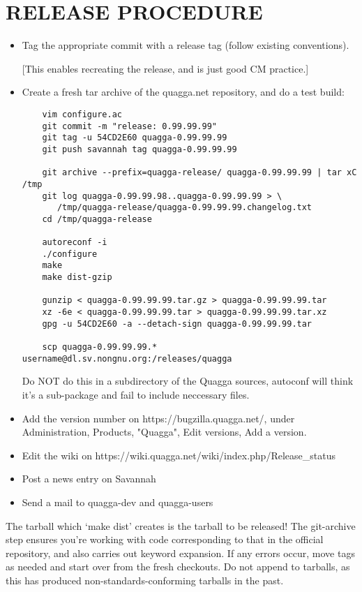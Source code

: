 \documentclass[oneside]{article}
\begin{document}
\section{RELEASE PROCEDURE}

\begin{itemize}
\item Tag the appropriate commit with a release tag (follow existing
  conventions).
  
  [This enables recreating the release, and is just good CM practice.]

\item Create a fresh tar archive of the quagga.net repository, and do a test
  build:

  \begin{verbatim}
    vim configure.ac
    git commit -m "release: 0.99.99.99"
    git tag -u 54CD2E60 quagga-0.99.99.99
    git push savannah tag quagga-0.99.99.99

    git archive --prefix=quagga-release/ quagga-0.99.99.99 | tar xC /tmp
    git log quagga-0.99.99.98..quagga-0.99.99.99 > \
       /tmp/quagga-release/quagga-0.99.99.99.changelog.txt
    cd /tmp/quagga-release

    autoreconf -i
    ./configure
    make
    make dist-gzip

    gunzip < quagga-0.99.99.99.tar.gz > quagga-0.99.99.99.tar
    xz -6e < quagga-0.99.99.99.tar > quagga-0.99.99.99.tar.xz
    gpg -u 54CD2E60 -a --detach-sign quagga-0.99.99.99.tar

    scp quagga-0.99.99.99.* username@dl.sv.nongnu.org:/releases/quagga
  \end{verbatim}

  Do NOT do this in a subdirectory of the Quagga sources, autoconf will think
  it's a sub-package and fail to include neccessary files.

\item Add the version number on https://bugzilla.quagga.net/, under
  Administration, Products, "Quagga", Edit versions, Add a version.
\item Edit the wiki on https://wiki.quagga.net/wiki/index.php/Release\_status
\item Post a news entry on Savannah
\item Send a mail to quagga-dev and quagga-users
\end{itemize}

The tarball which `make dist' creates is the tarball to be released! The
git-archive step ensures you're working with code corresponding to that in
the official repository, and also carries out keyword expansion. If any
errors occur, move tags as needed and start over from the fresh checkouts.
Do not append to tarballs, as this has produced non-standards-conforming
tarballs in the past.
\end{document}
